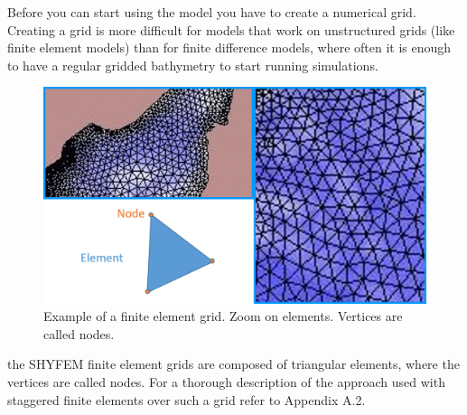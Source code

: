 
%
%
%
%
%
%
%
\label{preprocessing}

Before you can start using the model you have to create a numerical grid.
Creating a grid is more difficult for models that work on unstructured grids
(like finite element models) than for finite difference models, where
often it is enough to have a regular gridded bathymetry to start running
simulations.

\begin{figure}[htbp]
\centering
\includegraphics[scale=0.5]{example_finite_elements.png}
\caption{Example of  a finite element grid. Zoom on elements. Vertices are called nodes.}
\label{grd_example}
\end{figure}

the SHYFEM finite element grids are composed of triangular elements, 
where the vertices are called nodes. For a thorough description of the 
approach used with staggered finite elements
over such a grid refer to Appendix A.2.

